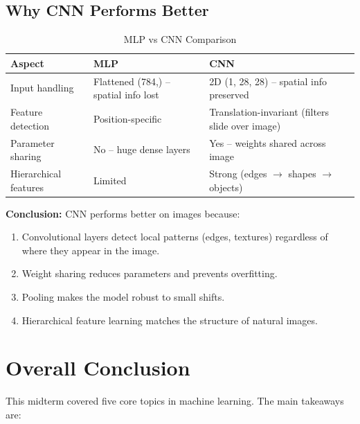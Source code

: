 \documentclass[11pt,a4paper]{article}
\begin{document}
\subsection{Why CNN Performs Better}

\begin{table}[H]
\centering
\caption{MLP vs CNN Comparison}
\begin{tabular}{p{4cm}p{5cm}p{5cm}}
\toprule
\textbf{Aspect} & \textbf{MLP} & \textbf{CNN} \\
\midrule
Input handling      & Flattened (784,) -- spatial info lost & 2D (1, 28, 28) -- spatial info preserved \\
Feature detection   & Position-specific & Translation-invariant (filters slide over image) \\
Parameter sharing   & No -- huge dense layers & Yes -- weights shared across image \\
Hierarchical features & Limited & Strong (edges $\to$ shapes $\to$ objects) \\
\bottomrule
\end{tabular}
\end{table}

\textbf{Conclusion:} CNN performs better on images because:
\begin{enumerate}
    \item Convolutional layers detect local patterns (edges, textures) regardless of where they appear in the image.
    \item Weight sharing reduces parameters and prevents overfitting.
    \item Pooling makes the model robust to small shifts.
    \item Hierarchical feature learning matches the structure of natural images.
\end{enumerate}

\newpage

\section{Overall Conclusion}

This midterm covered five core topics in machine learning. The main takeaways are:
\end{document}
